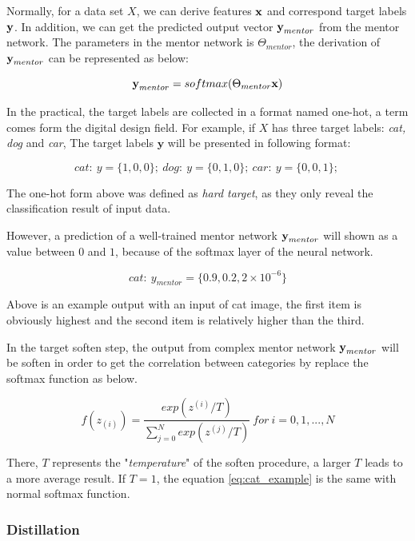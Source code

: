 \documentclass[article]{aaltoseries}
\begin{document}
Normally, for a data set \(X\), we can derive features \(\textbf x \) and correspond target labels \(\textbf y\).
In addition, we can get the predicted output vector \(\textbf y_{mentor}\) from the mentor network.
The parameters in the mentor network is \(\Theta_{mentor}\), 
the derivation of \(\textbf y_{mentor}\) can be represented as below:

\[
  \textbf y_{mentor} = softmax(\Theta_{mentor} \textbf{x})
\]

In the practical, the target labels are collected in a format named one-hot, a term comes form the digital
design field\cite{DigitalDesign}. For example, if \(X\) has three target labels: \emph{cat, dog} and \emph{car},
The target labels \(\textbf{y}\) will be presented in following format:

\[
  cat:\ y = \{1,0,0\};\ 
  dog:\ y = \{0,1,0\};\ 
  car:\ y = \{0,0,1\};\ 
\]

The one-hot form above was defined as \emph{hard target}, as they only reveal the classification result of input data.

However, a prediction of a well-trained mentor network \(\textbf y_{mentor}\) will shown as a value between 
\(0\) and \(1\), because of the softmax layer of the neural network. 

\begin{equation} \label{eq:cat_example}
  cat:\ y_{mentor} = \{0.9,0.2,2 \times 10^{-6}\}
\end{equation}

Above is an example output with an input of cat image, 
the first item is obviously highest and the second item is relatively higher than the third.


In the target soften step, 
the output from complex mentor network \(\textbf y_{mentor}\) will be soften in order to get the correlation between categories
by replace the softmax function as below.

\begin{equation} \label{eq:new_soft_max}
  f(z_{(i)}) = \frac{exp(z^{(i)}/T)}{\sum_{j=0}^{N}exp(z^{(j)}/T)}\ for\ i=0,1,...,N
\end{equation}

There, \(T\) represents the "\emph{temperature}" of the soften procedure, a larger \(T\) leads to a more average result. 
If \(T =1\), the equation \ref{eq:cat_example} is the same with normal softmax function. 


\subsubsection{Distillation}
\end{document}
